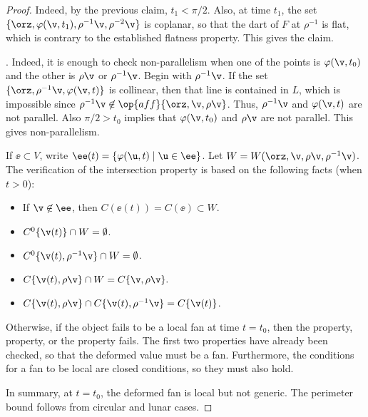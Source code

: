 \begin{proof}
Indeed,
by the previous claim, $t_1 <\pi/2$.  
Also, at time $t_1$,  the set $\{\orz,\varphi(\v,t_1),\rho^{-1}\v,\rho^{-2}\v\}$ is coplanar,
so that the dart of $F$ at $\rho^{-1}$ is flat, which is contrary to the established flatness
property.  This gives the claim.

.  Indeed, it
is enough to check non-parallelism when one of the points is
$\varphi(\v,t_0)$ and the other is $\rho\v$ or $\rho^{-1}\v$.  
Begin with $\rho^{-1}\v$.  If the set $\{\orz,\rho^{-1}\v,\varphi(\v,t)\}$ is collinear,
then that line is contained
in $L$,
which is impossible since $\rho^{-1}\v\not\in
\op{aff}\{\orz,\v,\rho\v\}$.  Thus, $\rho^{-1}\v$ and $\varphi(\v,t)$
are not parallel.
Also  $\pi/2 > t_0$ implies that $\varphi(\v,t_0)$ and $\rho\v$ are
not parallel. This gives non-parallelism.

  If $\ee\subset V$,
write $\ee(t) = \{\varphi(\u,t) \mid \u\in \ee\}$.  Let $W
=W(\orz,\v,\rho\v,\rho^{-1}\v)$. The verification of the intersection
property is based on the following facts (when $t>0$):
\begin{itemize} 
\item If $\v\not\in \ee$, then $C(\ee(t))=C(\ee)\subset W$.
\item $C^0\{\v(t)\} \cap W = \emptyset$.
\item $C^0\{\v(t),\rho^{-1}\v\}\cap W = \emptyset$.
\item $C\{\v(t),\rho\v\}\cap W = C\{\v,\rho\v\}.$
\item $C\{\v(t),\rho\v\}\cap C\{\v(t),\rho^{-1}\v\} = C\{\v(t)\}$.
\end{itemize}

Otherwise, if the object fails to be a local fan at time $t=t_0$, then the
 property,  property, or the
 property fails.  The first two properties have already
been checked, so that the deformed value must be a fan.  Furthermore,
the conditions for a fan to be local are closed conditions, so they
must also hold.

In summary, at $t=t_0$, the deformed fan is local but not generic.  The perimeter
bound follows from circular and lunar cases.
\end{proof}

